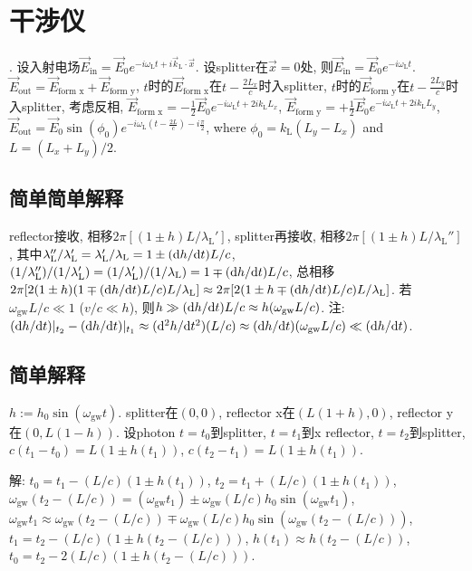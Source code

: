 \chapter{干涉仪}

\cite{Maggiore2014}. 设入射电场$\vec{E}_\text{in}=\vec{E}_0e^{-i\omega_\text{L}t+i\vec{k}_\text{L}\cdot\vec{x}}$. 设splitter在$\vec{x}=0$处, 则$\vec{E}_\text{in}=\vec{E}_0e^{-i\omega_\text{L}t}$. $\vec{E}_\text{out}=\vec{E}_\text{form x}+\vec{E}_\text{form y}$, $t$时的$\vec{E}_\text{form x}$在$t-\frac{2L_x}{c}$时入splitter, $t$时的$\vec{E}_\text{form y}$在$t-\frac{2L_y}{c}$时入splitter, 考虑反相, $\vec{E}_\text{form x}=-\frac{1}{2}\vec{E}_0e^{-i\omega_\text{L}t+2ik_\text{L}L_x}$, $\vec{E}_\text{form y}=+\frac{1}{2}\vec{E}_0e^{-i\omega_\text{L}t+2ik_\text{L}L_y}$, $\vec{E}_\text{out}=\vec{E}_0\sin(\phi_0)e^{-i\omega_\text{L}(t-\frac{2L}{c})-i\frac{\pi}{2}}$, where $\phi_0=k_\text{L}(L_y-L_x)$ and $L=(L_x+L_y)/2$.

\section{简单简单解释}

reflector接收, 相移$2\pi[(1\pm h)L/\lambda_\text{L}']$, splitter再接收, 相移$2\pi[(1\pm h)L/\lambda_\text{L}'']$, 其中$\lambda_\text{L}''/\lambda_\text{L}'=\lambda_\text{L}'/\lambda_\text{L}=1\pm(\mathrm{d} h/\mathrm{d} t)L/c$, $(1/\lambda_\text{L}'')/(1/\lambda_\text{L}')=(1/\lambda_\text{L}')/(1/\lambda_\text{L})=1\mp(\mathrm{d} h/\mathrm{d} t)L/c$, 总相移$2\pi[2(1\pm h)(1\mp(\mathrm{d} h/\mathrm{d} t)L/c)L/\lambda_\text{L}]\approx2\pi[2(1\pm h\mp(\mathrm{d} h/\mathrm{d} t)L/c)L/\lambda_\text{L}]$. 若$\omega_\text{gw}L/c\ll1$ ($v/c\ll h$), 则$h\gg(\mathrm{d} h/\mathrm{d} t)L/c\approx h(\omega_\text{gw}L/c)$. 注: $(\mathrm{d} h/\mathrm{d} t)|_{t_2}-(\mathrm{d} h/\mathrm{d} t)|_{t_1}\approx(\mathrm{d}^2 h/\mathrm{d} t^2)(L/c)\approx(\mathrm{d} h/\mathrm{d} t)(\omega_\text{gw}L/c)\ll(\mathrm{d} h/\mathrm{d} t)$.

\section{简单解释}

$h:=h_0\sin(\omega_\text{gw} t)$. splitter在$(0,0)$, reflector x在$(L(1+h),0)$, reflector y在$(0,L(1-h))$. 设photon $t=t_0$到splitter, $t=t_1$到x reflector, $t=t_2$到splitter, $c(t_1-t_0)=L(1 \pm h(t_1))$, $c(t_2-t_1)=L(1 \pm h(t_1))$.

解: $t_0=t_1-(L/c)(1 \pm h(t_1))$, $t_2=t_1+(L/c)(1 \pm h(t_1))$, $\omega_\text{gw} (t_2-(L/c))=(\omega_\text{gw} t_1) \pm \omega_\text{gw} (L/c) h_0 \sin(\omega_\text{gw} t_1)$, $\omega_\text{gw} t_1 \approx \omega_\text{gw} (t_2-(L/c)) \mp \omega_\text{gw} (L/c) h_0 \sin(\omega_\text{gw} (t_2-(L/c)))$, $t_1=t_2-(L/c)(1 \pm h(t_2-(L/c)))$, $h(t_1) \approx h(t_2-(L/c))$, $t_0=t_2-2(L/c)(1 \pm h(t_2-(L/c)))$.


